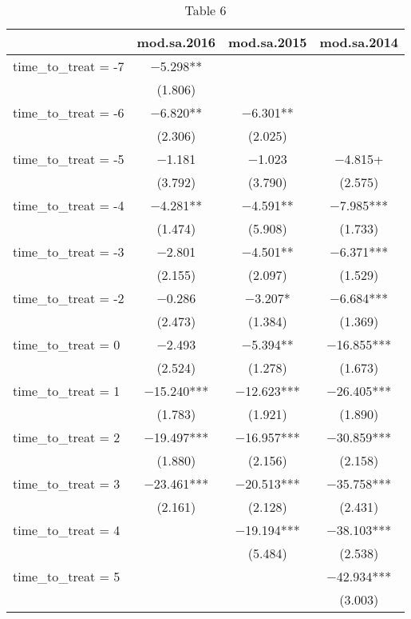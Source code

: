 \begin{table}

\caption{\label{tab:unnamed-chunk-1}Table 6}
\centering
\begin{tabular}[t]{lccc}
\toprule
  & mod.sa.2016 & mod.sa.2015 & mod.sa.2014\\
\midrule
time\_to\_treat = -7 & \num{-5.298}** &  & \\
 & (\num{1.806}) &  & \\
time\_to\_treat = -6 & \num{-6.820}** & \num{-6.301}** & \\
 & (\num{2.306}) & (\num{2.025}) & \\
time\_to\_treat = -5 & \num{-1.181} & \num{-1.023} & \num{-4.815}+\\
 & (\num{3.792}) & (\num{3.790}) & (\num{2.575})\\
time\_to\_treat = -4 & \num{-4.281}** & \num{-4.591}** & \num{-7.985}***\\
 & (\num{1.474}) & (\num{5.908}) & (\num{1.733})\\
time\_to\_treat = -3 & \num{-2.801} & \num{-4.501}** & \num{-6.371}***\\
 & (\num{2.155}) & (\num{2.097}) & (\num{1.529})\\
time\_to\_treat = -2 & \num{-0.286} & \num{-3.207}* & \num{-6.684}***\\
 & (\num{2.473}) & (\num{1.384}) & (\num{1.369})\\
time\_to\_treat = 0 & \num{-2.493} & \num{-5.394}** & \num{-16.855}***\\
 & (\num{2.524}) & (\num{1.278}) & (\num{1.673})\\
time\_to\_treat = 1 & \num{-15.240}*** & \num{-12.623}*** & \num{-26.405}***\\
 & (\num{1.783}) & (\num{1.921}) & (\num{1.890})\\
time\_to\_treat = 2 & \num{-19.497}*** & \num{-16.957}*** & \num{-30.859}***\\
 & (\num{1.880}) & (\num{2.156}) & (\num{2.158})\\
time\_to\_treat = 3 & \num{-23.461}*** & \num{-20.513}*** & \num{-35.758}***\\
 & (\num{2.161}) & (\num{2.128}) & (\num{2.431})\\
time\_to\_treat = 4 &  & \num{-19.194}*** & \num{-38.103}***\\
 &  & (\num{5.484}) & (\num{2.538})\\
time\_to\_treat = 5 &  &  & \num{-42.934}***\\
 &  &  & (\num{3.003})\\

\end{tabular}
\end{table}
